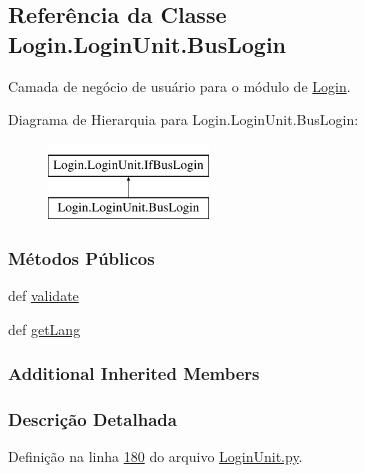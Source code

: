 \hypertarget{classLogin_1_1LoginUnit_1_1BusLogin}{\subsection{Referência da Classe Login.\-Login\-Unit.\-Bus\-Login}
\label{classLogin_1_1LoginUnit_1_1BusLogin}
}


Camada de negócio de usuário para o módulo de \hyperlink{namespaceLogin}{Login}.  


Diagrama de Hierarquia para Login.\-Login\-Unit.\-Bus\-Login\-:\begin{figure}[H]
\begin{center}
\leavevmode
\includegraphics[height=2.000000cm]{d9/d51/classLogin_1_1LoginUnit_1_1BusLogin}
\end{center}
\end{figure}
\subsubsection*{Métodos Públicos}
\begin{DoxyCompactItemize}
\item 
def \hyperlink{classLogin_1_1LoginUnit_1_1BusLogin_a2301425767b811697ce559801b955a58}{validate}
\item 
def \hyperlink{classLogin_1_1LoginUnit_1_1BusLogin_a23223ddd567bf874e6230efaf4912e98}{get\-Lang}
\end{DoxyCompactItemize}
\subsubsection*{Additional Inherited Members}


\subsubsection{Descrição Detalhada}


Definição na linha \hyperlink{LoginUnit_8py_source_l00180}{180} do arquivo \hyperlink{LoginUnit_8py_source}{Login\-Unit.\-py}.



